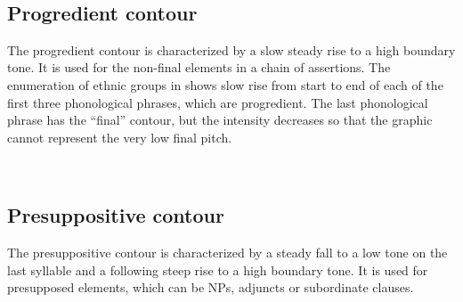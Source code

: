  \\
\subsection{Progredient contour}\label{sec:phon:Progredientcontour}
The progredient contour is characterized by a slow steady rise to a high boundary tone. It is used for the non-final elements in a chain of assertions. The enumeration of ethnic groups in  shows slow rise from start to end of each of the first three phonological phrases, which are progredient. The last phonological phrase has the ``final'' contour, but the intensity decreases so that the graphic cannot represent the very low final pitch.


 \\

\subsection{Presuppositive contour}\label{sec:phon:Presuppositivecontour}
The presuppositive contour is characterized by a steady fall to a low tone on the last syllable and a following steep rise to a high boundary tone. It is used for presupposed elements, which can be NPs, adjuncts or subordinate clauses.


